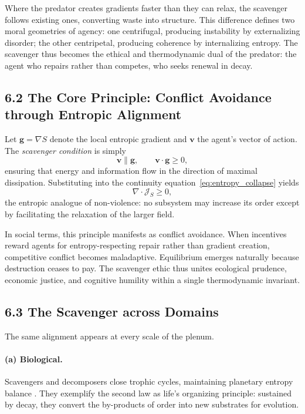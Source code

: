 \documentclass[11pt,a4paper,titlepage]{article}
\theoremstyle{definition}
\begin{document}
Where the predator creates gradients faster than they can relax, 
the scavenger follows existing ones, converting waste into structure.  
This difference defines two moral geometries of agency:  
one centrifugal, producing instability by externalizing disorder;  
the other centripetal, producing coherence by internalizing entropy.  
The scavenger thus becomes the ethical and thermodynamic dual of the predator:  
the agent who repairs rather than competes, who seeks renewal in decay.

\subsection{6.2 The Core Principle: Conflict Avoidance through Entropic Alignment}

Let $\mathbf{g}=\nabla S$ denote the local entropic gradient and 
$\mathbf{v}$ the agent’s vector of action.  
The \emph{scavenger condition} is simply  
\begin{equation}
\mathbf{v}\parallel \mathbf{g},
\qquad
\mathbf{v}\cdot\mathbf{g} \ge 0,
\label{eq:scavenger_condition}
\end{equation}
ensuring that energy and information flow in the direction of maximal 
dissipation.  
Substituting into the continuity equation~\eqref{eq:entropy_collapse} yields
\begin{equation}
\nabla\!\cdot\mathcal{J}_S \ge 0,
\label{eq:entropy_respect}
\end{equation}
the entropic analogue of non-violence:  
no subsystem may increase its order except by facilitating the relaxation of 
the larger field.  

In social terms, this principle manifests as conflict avoidance.  
When incentives reward agents for entropy-respecting repair rather than 
gradient creation, competitive conflict becomes maladaptive.  
Equilibrium emerges naturally because destruction ceases to pay.  
The scavenger ethic thus unites ecological prudence, economic justice, and 
cognitive humility within a single thermodynamic invariant.

\subsection{6.3 The Scavenger across Domains}

The same alignment appears at every scale of the plenum.

\paragraph{(a) Biological.}
Scavengers and decomposers close trophic cycles, maintaining planetary entropy 
balance \cite{margulis1998}.  
They exemplify the second law as life’s organizing principle:  
sustained by decay, they convert the by-products of order into new substrates 
for evolution.
\end{document}
